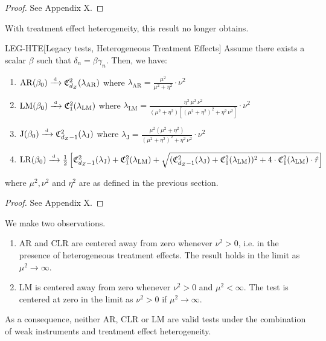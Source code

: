 \begin{proof}
    See Appendix X.
\end{proof}
\noindent
With treatment effect heterogeneity, this result no longer obtains.
\begin{lemmap}{LEG-HTE}[Legacy tests, Heterogeneous Treatment Effects] Assume there exists a scalar \(\beta\) such that \(\delta_n=\beta \gamma_n\). Then, we have:
    \begin{enumerate}
        \item 
        \(\mathrm{AR}(\beta_0)\xrightarrow{{\scriptscriptstyle \mathrm{\;d\;}}} \mathfrak{C}^2_{d_Z}(\lambda_{\mathrm{AR}})\)  where \(\lambda_{\mathrm{AR}} = \frac{\mu^2}{\mu^2+\eta^2} \cdot \nu^2\)
        \item 
        \(\mathrm{LM}(\beta_0)\xrightarrow{{\scriptscriptstyle \mathrm{\;d\;}}} \mathfrak{C}^2_1(\lambda_{\mathrm{LM}})\) where \(\lambda_{\mathrm{LM}} = \frac{\eta^2\,\mu^2\,\nu^2}{(\mu^2+\eta^2)[(\mu^2+\eta^2)^2 + \eta^2\,\nu^2]} \cdot \nu^2\)
        \item 
        \(\mathrm{J}(\beta_0)\xrightarrow{{\scriptscriptstyle \mathrm{\;d\;}}} \mathfrak{C}^2_{d_Z-1}(\lambda_{\mathrm{J}})\)  where \(\lambda_{\mathrm{J}} = \frac{\mu^2(\mu^2+\eta^2)}{(\mu^2+\eta^2)^2 + \eta^2\,\nu^2} \cdot \nu^2\)        
        \item 
        \(\mathrm{LR}(\beta_0)\xrightarrow{{\scriptscriptstyle \mathrm{\;d\;}}} \frac{1}{2}\left[\mathfrak{C}^2_{d_Z-1}(\lambda_{\mathrm{J}})+\mathfrak{C}^2_1(\lambda_{\mathrm{LM}}) + \sqrt{(\mathfrak{C}^2_{d_Z-1}(\lambda_{\mathrm{J}})+\mathfrak{C}^2_1(\lambda_{\mathrm{LM}}))^2 + 4 \cdot \mathfrak{C}^2_1(\lambda_{\mathrm{LM}}) \cdot \hat r} \right]\) 
    \end{enumerate}
    \noindent
where \(\mu^2,\nu^2\) and \(\eta^2\) are as defined in the previous section.
\end{lemmap}
\begin{proof}
    See Appendix X.
\end{proof}
\begin{remark} 
We make two observations.
\begin{enumerate}
    \item 
    AR and CLR are centered away from zero whenever \(\nu^2>0\), i.e. in the presence of heterogeneous treatment effects. The result holds in the limit as \(\mu^2\to\infty\). 
    \item 
    LM  is centered away from zero whenever \(\nu^2>0\) and \(\mu^2<\infty\). The test is centered at zero in the limit as \(\nu^2>0\) if \(\mu^2\to\infty\).    
\end{enumerate}
As a consequence, neither AR, CLR or LM are valid tests under the combination of weak instruments and treatment effect heterogeneity.
\end{remark}
